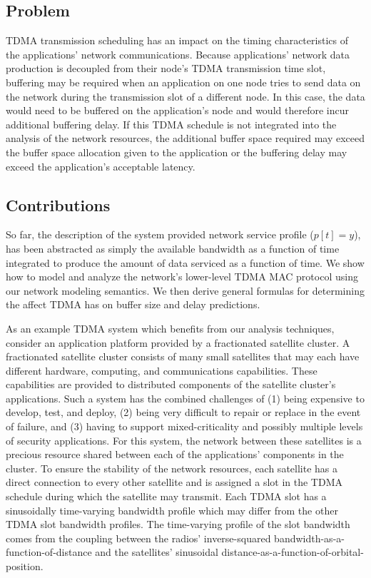 \subsection{Problem}
TDMA transmission scheduling has an impact on the timing
characteristics of the applications' network communications.  Because
applications' network data production is decoupled from their node's
TDMA transmission time slot, buffering may be required when an
application on one node tries to send data on the network during the
transmission slot of a different node.  In this case, the data would
need to be buffered on the application's node and would therefore
incur additional buffering delay.  If this TDMA schedule is not
integrated into the analysis of the network resources, the additional
buffer space required may exceed the buffer space allocation given to
the application or the buffering delay may exceed the application's
acceptable latency.

\subsection{Contributions}

So far, the description of the system provided network service profile
($p[t]=y$), has been abstracted as simply the available
bandwidth as a function of time integrated to produce the amount of
data serviced as a function of time. We show how to model and analyze
the network's lower-level TDMA MAC protocol using our network modeling
semantics.  We then derive general formulas for determining the affect
TDMA has on buffer size and delay predictions.

As an example TDMA system which benefits from our analysis techniques,
consider an application platform provided by a fractionated satellite
cluster.  A fractionated satellite cluster consists of many small
satellites that may each have different hardware, computing, and
communications capabilities.  These capabilities are provided to
distributed components of the satellite cluster's applications.  Such
a system has the combined challenges of (1) being expensive to
develop, test, and deploy, (2) being very difficult to repair or
replace in the event of failure, and (3) having to support
mixed-criticality and possibly multiple levels of security
applications.  For this system, the network between these satellites
is a precious resource shared between each of the applications'
components in the cluster.  To ensure the stability of the network
resources, each satellite has a direct connection to every other
satellite and is assigned a slot in the TDMA schedule during which the
satellite may transmit.  Each TDMA slot has a sinusoidally
time-varying bandwidth profile which may differ from the other TDMA
slot bandwidth profiles.  The time-varying profile of the slot
bandwidth comes from the coupling between the radios' inverse-squared
bandwidth-as-a-function-of-distance and the satellites' sinusoidal
distance-as-a-function-of-orbital-position.

